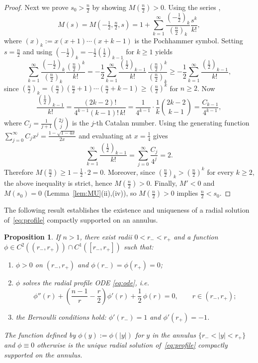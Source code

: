 \documentclass[11pt]{article}
\numberwithin{equation}{section}
\newtheorem{proposition}[theorem]{Proposition}
\theoremstyle{definition}
\begin{document}
\begin{proof}
Next we prove $s_0>\frac n2$ by showing $M(\tfrac n2)>0$.
Using the series \cite[Eq.~13.2.2]{DLMF},
\[
M(s)=M\!\left(-\tfrac12,\tfrac n2,s\right)
=1+\sum_{k=1}^{\infty}\frac{(-\tfrac12)_k}{(\tfrac n2)_k}\frac{s^k}{k!},
\]
where $(x)_k:= x(x+1) \cdots (x+k-1)$ is the Pochhammer symbol.
Setting $s=\tfrac n2$ and using $(-\tfrac12)_k=-\tfrac12( \tfrac12)_{k-1}$ for $k\ge1$ yields
\[
\sum_{k=1}^{\infty}\frac{(-\tfrac12)_k}{(\tfrac n2)_k}\frac{(\tfrac n2)^k}{k!}
=-\frac12\sum_{k=1}^{\infty}\frac{(\tfrac12)_{k-1}}{k!}\,\frac{(\tfrac n2)^k}{(\tfrac n2)_k}
\ge -\frac12\sum_{k=1}^{\infty}\frac{(\tfrac12)_{k-1}}{k!},
\]
since $(\tfrac n2)_k=(\tfrac n2)(\tfrac n2+1)\cdots(\tfrac n2+k-1)\ge(\tfrac n2)^k$ for $n\ge2$.
Now
\[
\frac{(\tfrac12)_{k-1}}{k!}
=\frac{(2k-2)!}{4^{k-1}(k-1)!\,k!}
=\frac{1}{4^{k-1}}\cdot\frac{1}{k}\binom{2k-2}{k-1}
=\frac{C_{k-1}}{4^{k-1}},
\]
where $C_j=\frac{1}{j+1}\binom{2j}{j}$ is the $j$-th Catalan number. Using the generating function
$\sum_{j=0}^{\infty}C_j x^j=\frac{1-\sqrt{1-4x}}{2x}$ and evaluating at $x=\tfrac14$ gives
\[
\sum_{k=1}^{\infty}\frac{(\tfrac12)_{k-1}}{k!}=\sum_{j=0}^{\infty}\frac{C_j}{4^j}=2.
\]
Therefore $M(\tfrac n2)\ge 1-\frac12\cdot 2=0$. Moreover, since $(\tfrac n2)_k>(\tfrac n2)^k$ for
every $k\ge2$, the above inequality is strict, hence $M(\tfrac n2)>0$.
Finally, $M'<0$ and $M(s_0)=0$ (Lemma~\ref{lem:MU}(ii),(iv)), so $M(\tfrac n2)>0$ implies $\tfrac n2<s_0$.
\end{proof}

The following result establishes the existence and uniqueness of a radial solution of~\eqref{eq:profile} compactly supported on an annulus.

\begin{proposition}\label{prop:odesol}
If $n>1$, there exist radii $0 < r_- < r_+$ and a function $\phi \in C^2((r_-,r_+)) \cap C^1([r_-,r_+])$ such that:
\begin{enumerate}
\item[\textup{(i)}] $\phi > 0$ on $(r_-,r_+)$ and $\phi(r_-) = \phi(r_+) = 0$;
\item[\textup{(ii)}] $\phi$ solves the radial profile ODE \eqref{eq:ode}, i.e.
\[
\phi''(r) + \left(\frac{n-1}{r} - \frac{r}{2}\right)\phi'(r) + \frac{1}{2}\,\phi(r) = 0, \qquad r \in (r_-,r_+);
\]
\item[\textup{(iii)}] the Bernoulli conditions hold: $\phi'(r_-) = 1$ and $\phi'(r_+) = -1$.
\end{enumerate}
The function defined by $\phi(y) := \phi(|y|)$ for $y$ in the annulus $\{r_- < |y| < r_+\}$ and $\phi \equiv 0$ otherwise is the unique radial solution of~\eqref{eq:profile} compactly supported on the annulus.
\end{proposition}
\end{document}
